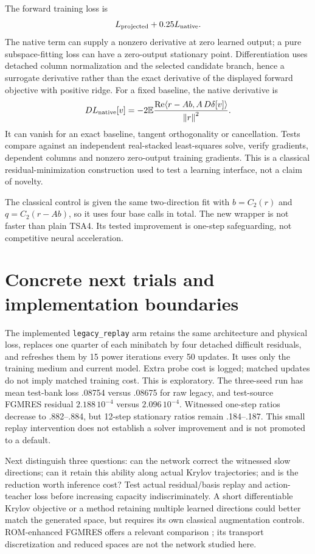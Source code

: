 \documentclass[11pt]{article}
\newcommand{\norm}[1]{\left\|#1\right\|}
\begin{document}
The forward training loss is
\[
 L_{\rm projected}+0.25L_{\rm native}.
\]
The native term can supply a nonzero derivative at zero learned output; a pure
subspace-fitting loss can have a zero-output stationary point. Differentiation
uses detached column normalization and the selected candidate branch, hence a
surrogate derivative rather than the exact derivative of the displayed forward
objective with positive ridge. For a fixed baseline, the native derivative is
\[
 DL_{\rm native}[v]=-2\mathbb E
 \frac{\operatorname{Re}\langle r-Ab,A\,D\delta[v]\rangle}{\norm r^2}.
\]
It can vanish for an exact baseline, tangent orthogonality or cancellation. Tests
compare against an independent real-stacked least-squares solve, verify
gradients, dependent columns and nonzero zero-output training gradients.
This is a classical residual-minimization construction used to test a learning
interface, not a claim of novelty.

The classical control is given the same two-direction fit with
$b=C_2(r)$ and $q=C_2(r-Ab)$, so it uses four base calls in total. The new
wrapper is not faster than plain TSA4. Its tested improvement is one-step
safeguarding, not competitive neural acceleration.

\section{Concrete next trials and implementation boundaries}
The implemented \texttt{legacy\_replay} arm retains the same architecture and
physical loss, replaces one quarter of each minibatch by four detached
difficult residuals, and refreshes them by 15 power iterations every 50 updates.
It uses only the training medium and current model. Extra probe cost is logged;
matched updates do not imply matched training cost. This is exploratory.
The three-seed run has mean test-bank loss .08754 versus .08675 for raw
legacy, and test-source FGMRES residual $2.188\,10^{-4}$ versus
$2.096\,10^{-4}$. Witnessed one-step ratios decrease to .882--.884, but
12-step stationary ratios remain .184--.187. This small replay intervention
does not establish a solver improvement and is not promoted to a default.

Next distinguish three questions: can the network correct the witnessed slow
directions; can it retain this ability along actual Krylov trajectories; and
is the reduction worth inference cost? Test actual residual/basis replay and
action-teacher loss before increasing capacity indiscriminately. A short
differentiable Krylov objective or a method retaining multiple learned
directions could better match the generated space, but requires its own
classical augmentation controls. ROM-enhanced FGMRES offers a relevant
comparison \cite{peng}; its transport discretization and reduced spaces are
not the network studied here.
\end{document}
